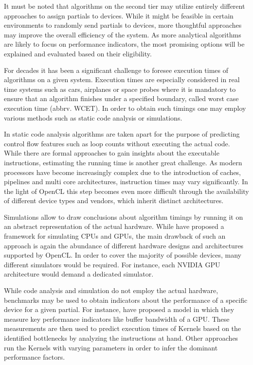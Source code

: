 It must be noted that algorithms on the second tier may utilize entirely different approaches to assign partials to devices. While it might be feasible in certain environments to randomly send partials to devices, more thoughtful approaches may improve the overall efficiency of the system. As more analytical algorithms are likely to focus on performance indicators, the most promising options will be explained and evaluated based on their eligibility.

For decades it has been a significant challenge to foresee execution times of algorithms on a given system. Execution times are especially considered in real time systems such as cars, airplanes or space probes where it is mandatory to ensure that an algorithm finishes under a specified boundary, called worst case execution time (abbrv. WCET). In order to obtain such timings one may employ various methods such as static code analysis or simulations\cite{wcet}.

In static code analysis algorithms are taken apart for the purpose of predicting control flow features such as loop counts without executing the actual code\cite{loopbound}\cite{sweet}. While there are formal approaches to gain insights about the executable instructions, estimating the running time is another great challenge. As modern processors have become increasingly complex due to the introduction of caches, pipelines and multi core architectures, instruction times may vary significantly\cite{wcet}. In the light of OpenCL this step becomes even more difficult through the availability of different device types and vendors, which inherit distinct architectures.

Simulations allow to draw conclusions about algorithm timings by running it on an abstract representation of the actual hardware\cite{wcet}. While \citeauthor{multi2sim} have proposed a framework for simulating CPUs and GPUs\cite{multi2sim}, the main drawback of such an approach is again the abundance of different hardware designs and architectures supported by OpenCL. In order to cover the majority of possible devices, many different simulators would be required. For instance, each NVIDIA GPU architecture would demand a dedicated simulator.

While code analysis and simulation do not employ the actual hardware, benchmarks may be used to obtain indicators about the performance of a specific device for a given partial. For instance, \citeauthor{quantitative_performance} have proposed a model in which they measure key performance indicators like buffer bandwidth of a GPU\cite{quantitative_performance}. These measurements are then used to predict execution times of Kernels based on the identified bottlenecks by analyzing the instructions at hand. Other approaches run the Kernels with varying parameters in order to infer the dominant performance factors\cite{gpgpu_performance}.

